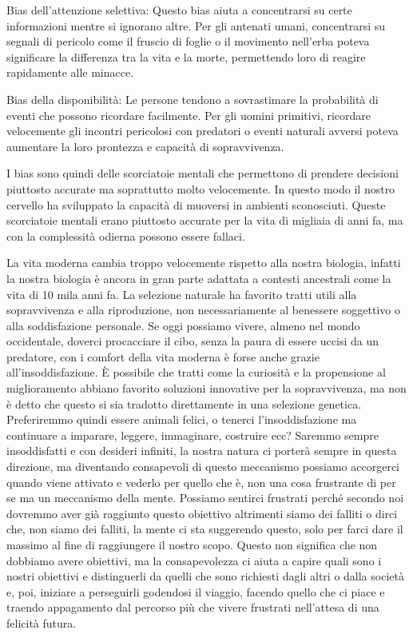 \documentclass[12pt]{book} %
\begin{document}
Bias dell'attenzione selettiva: Questo bias aiuta a concentrarsi su certe informazioni mentre si
ignorano altre. Per gli antenati umani, concentrarsi su segnali di pericolo come il fruscio di foglie o il movimento
nell'erba poteva significare la differenza tra la vita e la morte, permettendo loro di reagire
rapidamente alle minacce.

Bias della disponibilità: Le persone tendono a sovrastimare la probabilità di eventi che possono ricordare facilmente.
Per gli uomini primitivi, ricordare velocemente gli incontri pericolosi con predatori o eventi naturali avversi poteva
aumentare la loro prontezza e capacità di sopravvivenza.

I bias sono quindi delle scorciatoie mentali che permettono di prendere decisioni piuttosto accurate ma soprattutto
molto velocemente. In questo modo il nostro cervello ha sviluppato la capacità di muoversi in ambienti sconosciuti.
Queste scorciatoie mentali erano piuttosto accurate per la vita di migliaia di anni fa, ma con la complessità odierna
possono essere fallaci.

La vita moderna cambia troppo velocemente rispetto alla nostra biologia, infatti la nostra biologia è ancora in gran parte adattata a contesti ancestrali come la vita di 10 mila anni fa. 
La selezione naturale ha favorito tratti utili alla sopravvivenza e alla riproduzione, non necessariamente al benessere soggettivo o alla soddisfazione personale. Se oggi possiamo
vivere, almeno nel mondo occidentale, doverci procacciare il cibo, senza la paura di essere uccisi da un predatore, con
i comfort della vita moderna è forse anche grazie all'insoddisfazione. 
È possibile che tratti come la curiosità e la propensione al miglioramento abbiano favorito soluzioni innovative per la sopravvivenza, ma non è detto che questo si sia tradotto direttamente in una selezione genetica.
Preferiremmo quindi essere animali felici, o tenerci l'insoddisfazione ma continuare a
imparare, leggere, immaginare, costruire ecc? Saremmo sempre insoddisfatti e con desideri infiniti, la nostra natura ci
porterà sempre in questa direzione, ma diventando consapevoli di questo meccanismo possiamo accorgerci quando viene
attivato e vederlo per quello che è, non una cosa frustrante di per se ma un meccanismo della mente. Possiamo sentirci
frustrati perché secondo noi dovremmo aver già raggiunto questo obiettivo altrimenti siamo dei falliti o dirci che, non
siamo dei falliti, la mente ci sta suggerendo questo, solo per farci dare il massimo al fine di raggiungere il nostro
scopo. Questo non significa che non dobbiamo avere obiettivi, ma la consapevolezza ci aiuta a capire quali sono i
nostri obiettivi e distinguerli da quelli che sono richiesti dagli altri o dalla società e, poi, iniziare a perseguirli
godendosi il viaggio, facendo quello che ci piace e traendo appagamento dal percorso più che vivere frustrati
nell'attesa di una felicità futura.
\end{document}
